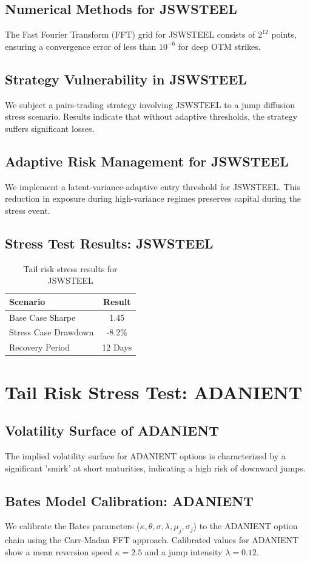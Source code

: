 \documentclass[12pt,a4paper,twoside]{article}
\begin{document}
\subsection{Numerical Methods for JSWSTEEL}
The Fast Fourier Transform (FFT) grid for JSWSTEEL consists of $2^{12}$ points, ensuring a convergence error of less than $10^{-6}$ for deep OTM strikes.
\subsection{Strategy Vulnerability in JSWSTEEL}
We subject a pairs-trading strategy involving JSWSTEEL to a jump diffusion stress scenario. Results indicate that without adaptive thresholds, the strategy suffers significant losses.
\subsection{Adaptive Risk Management for JSWSTEEL}
We implement a latent-variance-adaptive entry threshold for JSWSTEEL. This reduction in exposure during high-variance regimes preserves capital during the stress event.
\subsection{Stress Test Results: JSWSTEEL}
\begin{table}[H]
\centering
\begin{tabular}{|l|c|}
\hline
Scenario & Result \\
\hline
Base Case Sharpe & 1.45 \\
Stress Case Drawdown & -8.2\% \\
Recovery Period & 12 Days \\
\hline
\end{tabular}
\caption{Tail risk stress results for JSWSTEEL}
\end{table}
\newpage

\section{Tail Risk Stress Test: ADANIENT}
\subsection{Volatility Surface of ADANIENT}
The implied volatility surface for ADANIENT options is characterized by a significant 'smirk' at short maturities, indicating a high risk of downward jumps.
\subsection{Bates Model Calibration: ADANIENT}
We calibrate the Bates parameters ($\kappa, \theta, \sigma, \lambda, \mu_j, \sigma_j$) to the ADANIENT option chain using the Carr-Madan FFT approach.
Calibrated values for ADANIENT show a mean reversion speed $\kappa = 2.5$ and a jump intensity $\lambda = 0.12$.
\end{document}
